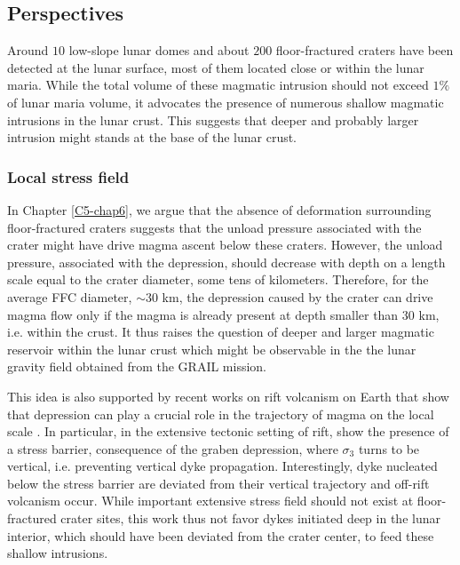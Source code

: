 \subsection*{Perspectives}
\label{sec:perspectives-2}


Around  $10$ low-slope  lunar  domes and  about $200$  floor-fractured
craters have been detected at the  lunar surface, most of them located
close  or within  the lunar  maria. While  the total  volume of  these
magmatic intrusion should  not exceed $1\%$ of lunar  maria volume, it
advocates the presence of numerous  shallow magmatic intrusions in the
lunar crust. This  suggests that deeper and  probably larger intrusion
might stands at the base of the lunar crust.

\subsubsection*{Local stress field}
\label{sec:crust-magm-intr}

In Chapter  \ref{C5-chap6}, we argue  that the absence  of deformation
surrounding floor-fractured craters suggests  that the unload pressure
associated with the  crater might have drive magma  ascent below these
craters. However, the unload pressure, associated with the depression,
should  decrease with  depth on  a length  scale equal  to the  crater
diameter, some  tens of  kilometers.  Therefore,  for the  average FFC
diameter, $\sim 30$ km, the depression  caused by the crater can drive
magma flow only if the magma  is already present at depth smaller than
$30$ km, i.e.  within the crust. It thus raises the question of deeper
and larger  magmatic reservoir within  the lunar crust which  might be
observable  in the  the lunar  gravity field  obtained from  the GRAIL
mission.

This idea is also supported by recent works on rift volcanism on Earth
that show that depression can play a crucial role in the trajectory of
magma on the local scale \citep{Maccaferri:2014ft}.  In particular, in
the extensive tectonic setting of rift, \citet{Maccaferri:2014ft} show
the  presence  of   a  stress  barrier,  consequence   of  the  graben
depression, where  $\sigma_3$ turns  to be vertical,  i.e.  preventing
vertical dyke  propagation.  Interestingly,  dyke nucleated  below the
stress  barrier  are  deviated  from  their  vertical  trajectory  and
off-rift  volcanism occur.   While  important  extensive stress  field
should not exist  at floor-fractured crater sites, this  work thus not
favor dykes  initiated deep in  the lunar interior, which  should have
been  deviated  from   the  crater  center,  to   feed  these  shallow
intrusions.

